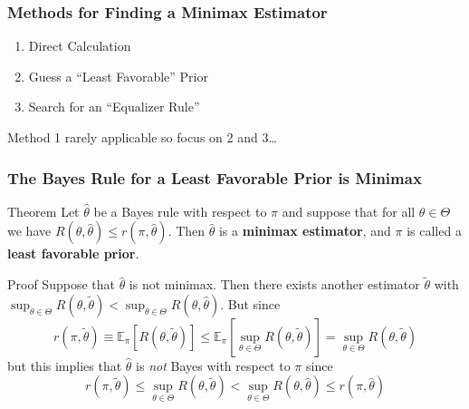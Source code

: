 \begin{frame}
  \frametitle{Methods for Finding a Minimax Estimator}

  \begin{enumerate}
    \item Direct Calculation 
    \item Guess a ``Least Favorable'' Prior
    \item Search for an ``Equalizer Rule''
  \end{enumerate}

  \vspace{2em}
  \hfill\alert{Method 1 rarely applicable so focus on 2 and 3\dots}

\end{frame}
\begin{frame}
  \frametitle{The Bayes Rule for a Least Favorable Prior is Minimax}


  \begin{block}{Theorem}
    \small
    Let $\widehat{\theta}$ be a Bayes rule with respect to $\pi$ and suppose that for all $\theta\in \Theta$ we have $R(\theta,\widehat{\theta}) \leq r(\pi, \widehat{\theta})$.
    Then $\widehat{\theta}$ is a \textbf{minimax estimator}, and $\pi$ is called a \textbf{least favorable prior}.
  \end{block}

  \begin{block}{Proof}
    \small
    Suppose that $\widehat{\theta}$ is not minimax.
    Then there exists another estimator $\widetilde{\theta}$ with $\sup_{\theta\in\Theta} R(\theta, \widetilde{\theta}) < \sup_{\theta\in \Theta} R(\theta, \widehat{\theta})$.
    But since
    \[
      r(\pi, \widetilde{\theta}) \equiv \mathbb{E}_{\pi}\left[ R(\theta,\widetilde{\theta}) \right] \leq \mathbb{E}_{\pi}\left[ \sup_{\theta \in \Theta} R(\theta, \widetilde{\theta}) \right] = \sup_{\theta \in \Theta} R(\theta, \widetilde{\theta})
    \]
    but this implies that $\widehat{\theta}$ is \emph{not} Bayes with respect to $\pi$ since 
    \[
      r(\pi, \widetilde{\theta}) \leq \sup_{\theta\in \Theta} R(\theta, \widetilde{\theta}) < \sup_{\theta \in \Theta} R(\theta, \widehat{\theta}) \leq r(\pi, \widehat{\theta})
    \]
  \end{block}
\end{frame}
